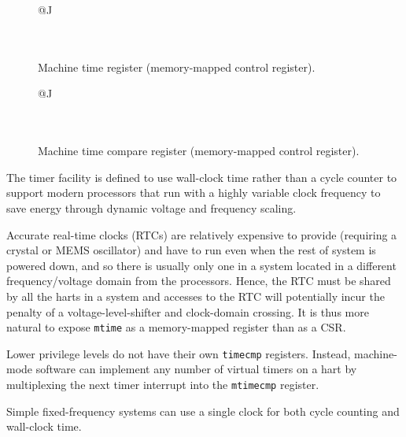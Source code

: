 \begin{figure}[h!]
{\footnotesize
\begin{center}
\begin{tabular}{@{}J}
 \\
\hline
{} \\
 \\
\end{tabular}
\end{center}
}
\vspace{-0.1in}
\caption{Machine time register (memory-mapped control register).}
\end{figure}

\begin{figure}[h!]
{\footnotesize
\begin{center}
\begin{tabular}{@{}J}
 \\
\hline
{} \\
 \\
\end{tabular}
\end{center}
}
\vspace{-0.1in}
\caption{Machine time compare register (memory-mapped control register).}
\end{figure}

\begin{commentary}
The timer facility is defined to use wall-clock time rather than a
cycle counter to support modern processors that run with a highly
variable clock frequency to save energy through dynamic voltage and
frequency scaling.

Accurate real-time clocks (RTCs) are relatively expensive to provide
(requiring a crystal or MEMS oscillator) and have to run even when the
rest of system is powered down, and so there is usually only one in a
system located in a different frequency/voltage domain from the
processors.  Hence, the RTC must be shared by all the harts in a
system and accesses to the RTC will potentially incur the penalty of a
voltage-level-shifter and clock-domain crossing.  It is thus more
natural to expose {\tt mtime} as a memory-mapped register than as a CSR.

Lower privilege levels do not have their own {\tt timecmp} registers.
Instead, machine-mode software can implement any number of virtual timers on
a hart by multiplexing the next timer interrupt into the {\tt mtimecmp}
register.

Simple fixed-frequency systems can use a single clock for both cycle
counting and wall-clock time.
\end{commentary}


